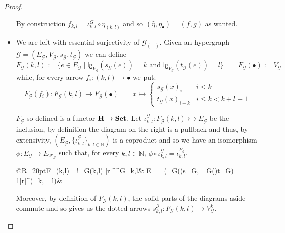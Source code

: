 \documentclass[3p]{elsarticle}
\newcommand{\lgh}{\mathsf{lg}}
\newcommand{\catname}[1]{\textbf{\textup{#1}}}
\newcommand{\mto}{\rightarrowtail}
\theoremstyle{remark}
\theoremstyle{definition}
\begin{document}
\begin{proof}
\begin{itemize}
	By construction $f_{k,l}= \iota^G_{k,l} \circ \eta_{(k,l)}$ and so $(\hat{\eta}, \eta_{\bullet})=(f,g)$ as wanted. 
	
		\item We are left with essential surjectivity of $\mathcal{G}_{(-)}$. Given an hypergraph $\mathcal{G}=(E_\mathcal{G}, V_\mathcal{G}, s_\mathcal{G}, t_\mathcal{G})$ we can define 
		\[	F_{\mathcal{G}}(k,l):=\{e\in E_{\mathcal{G}} \mid \lgh_{V_{\mathcal{G}}}(s_{{\mathcal{G}}}(e)) = k \text{ and } \lgh_{V_{\mathcal{G}}}(t_{{\mathcal{G}}}(e)) = l \} \qquad F_{\mathcal{G}}(\bullet):=V_\mathcal{G}\]
		while, for every arrow $f_i\colon (k,l)\to \bullet$ we put:
		\[F_{\mathcal{G}}(f_i)\colon F_{\mathcal{G}}(k,l)\to F_{\mathcal{G}}(\bullet) \qquad x\mapsto \begin{cases}
			s_\mathcal{G}(x)_i& i<k\\
			t_\mathcal{G}(x)_{i-k} &i\leq k < k+l-1
		\end{cases}  \]
		 
		\begin{minipage}[r]{.7\linewidth}
			$F_{\mathcal{G}}$ so defined is a functor $\catname{H}\to \catname{Set}$. Let $\iota^{\mathcal{G}}_{k,l}\colon F_{\mathcal{G}}(k,l)\mto E_{\mathcal{G}}$ be the inclusion, by definition the diagram on the right is a pullback and thus, by extensivity, $(E_{\mathcal{G}}, \{\iota^{\mathcal{G}}_{k,l}\}_{k,l\in \mathbb{N}})$ is a coproduct and so we have an isomorphism $\phi \colon E_{\mathcal{G}}\to E_{\mathcal{F}_{\mathcal{G}}}$ such that, for every $k,l\in \mathbb{N}$, $\phi\circ \iota^{\mathcal{G}}_{k,l} = \iota^{F_\mathcal{G}}_{k,l}$.
		\end{minipage}
		\hfill 
		\begin{minipage}[r]{.25\linewidth} \vspace{-.1cm}
			\xymatrix@C=50pt@R=20pt{F_{}(k,l) \ar[d]_{!_{G(k,l)}} \ar@{>->}[r]^{\iota^G_{k,l}}& E_{} \ar[d]_{(\lgh_{G(\bullet)}\circ s_{G}, \lgh_{G(\bullet)}\circ t_{G})} \\ 1\ar@{>->}[r]^{(\delta_{k}, \delta_{l})}&\mathbb{N}\times {}}
		\end{minipage}
		\begin{minipage}[l]{.55\linewidth}
		Moreover, by definition of $F_{\mathcal{G}}(k,l)$, the solid parts of the diagrams aside commute and so  gives us the dotted arrows $s_{k,l}^{\mathcal{G}}\colon F_{\mathcal{G}}(k,l)\to V^k_{\mathcal{G}}$.
		

\end{minipage}
\end{itemize}
\end{proof}
\end{document}
